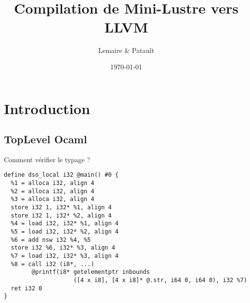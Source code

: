 \documentclass{beamer} %
\title[Luste $\mapsto$ LLVM]{Compilation de Mini-Lustre vers LLVM}
\institute[UPSaclay]{Université Paris-Saclay}
\author{Lemaire \& Patault}
\date{\today}
\begin{document}

\begin{frame}
    \titlepage
\end{frame}

\section{Introduction}

\subsection{TopLevel Ocaml}

\begin{frame}[fragile]{Comment vérifier le typage ?}
  \begin{verbatim}
define dso_local i32 @main() #0 {
  %1 = alloca i32, align 4
  %2 = alloca i32, align 4
  %3 = alloca i32, align 4
  store i32 1, i32* %1, align 4
  store i32 1, i32* %2, align 4
  %4 = load i32, i32* %1, align 4
  %5 = load i32, i32* %2, align 4
  %6 = add nsw i32 %4, %5
  store i32 %6, i32* %3, align 4
  %7 = load i32, i32* %3, align 4
  %8 = call i32 (i8*, ...)
        @printf(i8* getelementptr inbounds
                    ([4 x i8], [4 x i8]* @.str, i64 0, i64 0), i32 %7)
  ret i32 0
}
   \end{verbatim}
\end{frame}

\begin{frame}
    \tableofcontents[currentsection]
\end{frame}
\end{document}
